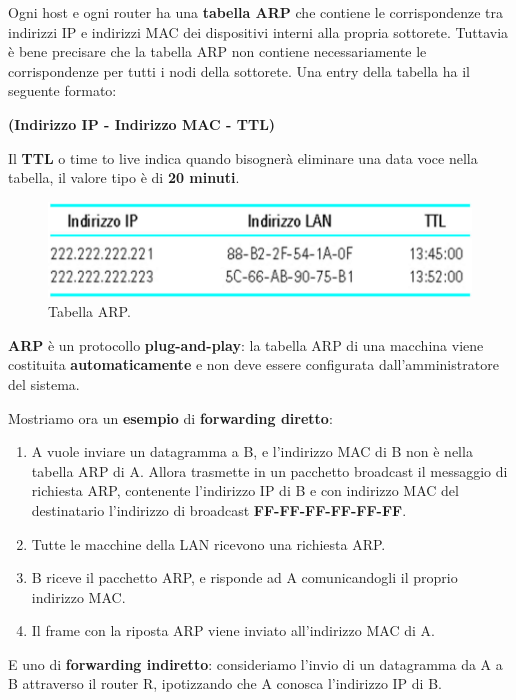 \documentclass[11pt,a4paper,oneside]{book}
\theoremstyle{definition}
\begin{document}
Ogni host e ogni router ha una \textbf{tabella ARP} che contiene le corrispondenze tra indirizzi IP e indirizzi MAC dei dispositivi interni alla propria sottorete.
Tuttavia è bene precisare che la tabella ARP non contiene necessariamente le corrispondenze per tutti i nodi della sottorete. Una entry della tabella ha il seguente formato:

\begin{center}
	\textbf{\large(Indirizzo IP - Indirizzo MAC - TTL)}
\end{center}

Il \textbf{TTL} o time to live indica quando bisognerà eliminare una
data voce nella tabella, il valore tipo è di \textbf{20 minuti}.

\begin{figure}[!h]
	\includegraphics[scale=0.25]{Immagini/ARP_tab.png}
	\centering
	\caption{Tabella ARP.}
\end{figure}

\textbf{ARP} è un protocollo \textbf{plug-and-play}: la tabella ARP di una macchina viene
costituita \textbf{automaticamente} e non deve essere configurata dall’amministratore del sistema.

Mostriamo ora un \textbf{esempio} di \textbf{forwarding diretto}:

\begin{enumerate}
	\item A vuole inviare un datagramma a B, e l’indirizzo MAC di B non è nella
	      tabella ARP di A. Allora trasmette in un pacchetto broadcast il messaggio di richiesta
	      ARP, contenente l’indirizzo IP di B e con indirizzo MAC del destinatario
	      l'indirizzo di broadcast \textbf{FF-FF-FF-FF-FF-FF}.
	\item Tutte le macchine della LAN ricevono una richiesta ARP.
	\item B riceve il pacchetto ARP, e risponde ad A comunicandogli il proprio indirizzo MAC.
	\item Il frame con la riposta ARP viene inviato all’indirizzo MAC di A.
\end{enumerate}

\pagebreak

E uno di \textbf{forwarding indiretto}: consideriamo l'invio di un datagramma da A a B attraverso il router R, ipotizzando che A conosca l'indirizzo IP di B.
\end{document}
